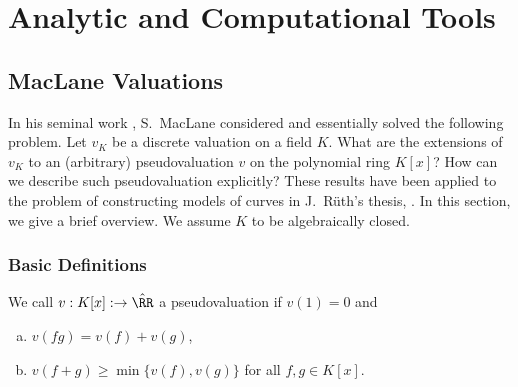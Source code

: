 \chapter{Analytic and Computational Tools}\label{ch:analytic-and-computational-tools}

\section{MacLane Valuations}

In his seminal work \cite{MacLane}, S.~MacLane considered and essentially solved the following problem.
Let $v_K$ be a discrete valuation on a field $K$.
What are the extensions of $v_K$ to an (arbitrary) pseudovaluation $v$ on the polynomial ring $K[x]$?
How can we describe such pseudovaluation explicitly?
These results have been applied to the problem of constructing models of curves in J.~Rüth's thesis, \cite{Rueth}. 
In this section, we give a brief overview.
We assume $K$ to be algebraically closed.


\subsection{Basic Definitions}

\begin{definition} \label{def:pseudo-valuation}
    We call $v: K[x]: \to \hat{\RR}$ a pseudovaluation if $v(1) = 0$ and
    \begin{enumerate}[(a)]
        \item $v(fg) = v(f) + v(g)$,
        \item $v(f + g) \geq \min\lbrace v(f), v(g) \rbrace$ for all $f,g\in K[x]$.
    \end{enumerate}
\end{definition}

